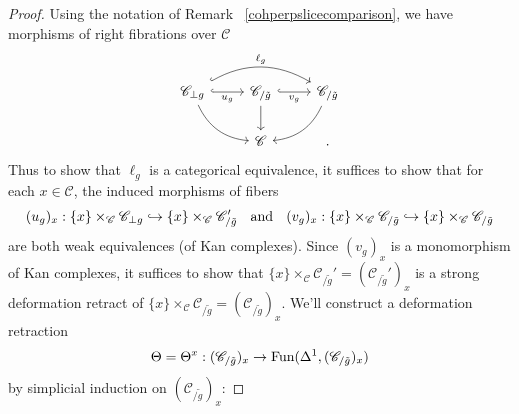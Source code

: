 \documentclass{tac}
\newcommand{\s}[1]{\mathscr{#1}}
\newcommand{\tx}[1]{\textnormal{#1}}
\begin{document}
\begin{proof} Using the notation of Remark ~\ref{cohperpslicecomparison}, we have morphisms of right fibrations over $\s{C}$
\[\begin{tikzcd}
\s{C}_{\perp g} \arrow[bend right]{dr} \arrow[hook, bend left]{rr}{\ell_g} \arrow[hook]{r}[swap]{u_g} &  \s{C}_{/\tilde{g}} \arrow[hook]{r}[swap]{v_g} \arrow[]{d} & \s{C}_{/\tilde{g}} \arrow[bend left]{dl} \\ 
& \s{C} & .
\end{tikzcd}\]
Thus to show that $\ell_g$ is a categorical equivalence, it suffices to show that for each $x \in \s{C}$, the induced morphisms of fibers
\[ ( u_g)_x : \{ x \} \times_\s{C} \s{C}_{\perp g} \hookrightarrow  \{ x \} \times_\s{C} \s{C}_{/ \tilde{g}}' \tx{ \; and \; } (v_g)_x : \{ x \} \times_\s{C} \s{C}_{/ \tilde{g}} \hookrightarrow  \{ x \} \times_\s{C} \s{C}_{/ \tilde{g}}  \]
are both weak equivalences (of Kan complexes).  Since $(v_g)_x$ is a monomorphism of Kan complexes, it suffices to show that $\{ x \} \times_\s{C} \s{C}_{/ \tilde{g}}' = (\s{C}_{/ \tilde{g}}')_x $ is a strong deformation retract of $\{ x \} \times_\s{C} \s{C}_{/ \tilde{g}}  = (\s{C}_{/ \tilde{g}})_x$.  We'll construct a deformation retraction 
\[ \Theta = \Theta^x :  (\s{C}_{/ \tilde{g}})_x \to \tx{Fun}(\Delta^1 , (\s{C}_{/ \tilde{g}})_x)  \]
by simplicial induction on $(\s{C}_{/ \tilde{g}})_x$:

\hfill


\end{proof}
\end{document}
